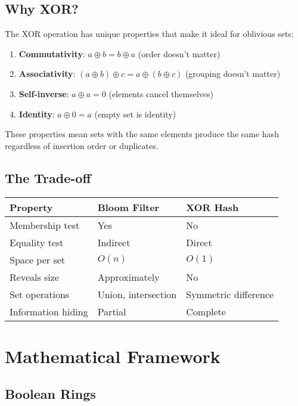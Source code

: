 \documentclass[11pt,final,hidelinks]{article}
\newcommand{\XOR}{\oplus}
\begin{document}
\subsection{Why XOR?}

The XOR operation has unique properties that make it ideal for oblivious sets:

\begin{enumerate}
    \item \textbf{Commutativity}: $a \XOR b = b \XOR a$ (order doesn't matter)
    \item \textbf{Associativity}: $(a \XOR b) \XOR c = a \XOR (b \XOR c)$ (grouping doesn't matter)
    \item \textbf{Self-inverse}: $a \XOR a = 0$ (elements cancel themselves)
    \item \textbf{Identity}: $a \XOR 0 = a$ (empty set is identity)
\end{enumerate}

These properties mean sets with the same elements produce the same hash regardless of insertion order or duplicates.

\subsection{The Trade-off}

\begin{center}
\begin{tabular}{lll}
\toprule
\textbf{Property} & \textbf{Bloom Filter} & \textbf{XOR Hash} \\
\midrule
Membership test & Yes & No \\
Equality test & Indirect & Direct \\
Space per set & $O(n)$ & $O(1)$ \\
Reveals size & Approximately & No \\
Set operations & Union, intersection & Symmetric difference \\
Information hiding & Partial & Complete \\
\bottomrule
\end{tabular}
\end{center}

\section{Mathematical Framework}

\subsection{Boolean Rings}
\end{document}
